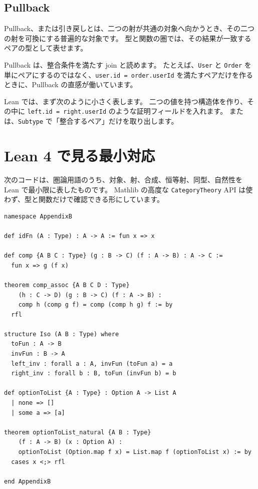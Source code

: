 \subsection{Pullback}

Pullback、または引き戻しとは、二つの射が共通の対象へ向かうとき、その二つの射を可換にする普遍的な対象です。
型と関数の圏では、その結果が一致するペアの型として表せます。

Pullback は、整合条件を満たす join と読めます。
たとえば、\texttt{User} と \texttt{Order} を単にペアにするのではなく、\texttt{user.id = order.userId} を満たすペアだけを作るときに、Pullback の直感が働いています。

Lean では、まず次のように小さく表します。
二つの値を持つ構造体を作り、その中に \texttt{left.id = right.userId} のような証明フィールドを入れます。
または、\texttt{Subtype} で「整合するペア」だけを取り出します。

\section{Lean 4 で見る最小対応}

次のコードは、圏論用語のうち、対象、射、合成、恒等射、同型、自然性を Lean で最小限に表したものです。
Mathlib の高度な \texttt{CategoryTheory} API は使わず、型と関数だけで確認できる形にしています。

\begin{listing}[htbp]
\begin{verbatim}
namespace AppendixB

def idFn (A : Type) : A -> A := fun x => x

def comp {A B C : Type} (g : B -> C) (f : A -> B) : A -> C :=
  fun x => g (f x)

theorem comp_assoc {A B C D : Type}
    (h : C -> D) (g : B -> C) (f : A -> B) :
    comp h (comp g f) = comp (comp h g) f := by
  rfl

structure Iso (A B : Type) where
  toFun : A -> B
  invFun : B -> A
  left_inv : forall a : A, invFun (toFun a) = a
  right_inv : forall b : B, toFun (invFun b) = b

def optionToList {A : Type} : Option A -> List A
  | none => []
  | some a => [a]

theorem optionToList_natural {A B : Type}
    (f : A -> B) (x : Option A) :
    optionToList (Option.map f x) = List.map f (optionToList x) := by
  cases x <;> rfl

end AppendixB
\end{verbatim}
\caption{\texttt{idFn}・\texttt{comp}・\texttt{Iso}・\texttt{optionToList\_natural}}
\label{lst:appB_category_minicode}
\end{listing}

